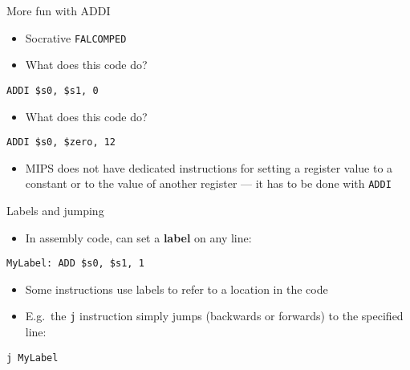 \begin{frame}[fragile]{More fun with ADDI}
	\begin{itemize}
		\pause\item Socrative \texttt{FALCOMPED}
		\pause\item What does this code do?
	\end{itemize}
	\begin{lstlisting}
ADDI $s0, $s1, 0
	\end{lstlisting}
	\begin{itemize}
		\pause\item What does this code do?
	\end{itemize}
	\begin{lstlisting}
ADDI $s0, $zero, 12
	\end{lstlisting}
	\begin{itemize}
		\pause\item MIPS does not have dedicated instructions for setting a register value to a
			constant or to the value of another register --- it has to be done with \lstinline{ADDI}
	\end{itemize}
\end{frame}

\begin{frame}[fragile]{Labels and jumping}
	\begin{itemize}
		\pause\item In assembly code, can set a \textbf{label} on any line:
	\end{itemize}
	\begin{lstlisting}
MyLabel: ADD $s0, $s1, 1
	\end{lstlisting}
	\begin{itemize}
		\pause\item Some instructions use labels to refer to a location in the code
		\pause\item E.g.\ the \lstinline{j} instruction
			simply jumps (backwards or forwards) to the specified line:
	\end{itemize}
	\begin{lstlisting}
j MyLabel
	\end{lstlisting}
\end{frame}

